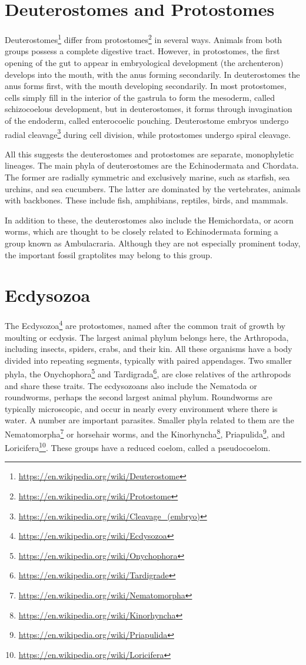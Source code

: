 \documentclass[]{book}
\let\rmarkdownfootnote\footnote%
\def\footnote{\protect\rmarkdownfootnote}
\renewcommand{\href}[2]{#2\footnote{\url{#1}}}
\theoremstyle{definition}
\theoremstyle{definition}
\theoremstyle{definition}
\theoremstyle{remark}
\begin{document}
\section{Deuterostomes and
Protostomes}\label{deuterostomes-and-protostomes}

\href{https://en.wikipedia.org/wiki/Deuterostome}{Deuterostomes} differ
from \href{https://en.wikipedia.org/wiki/Protostome}{protostomes} in
several ways. Animals from both groups possess a complete digestive
tract. However, in protostomes, the first opening of the gut to appear
in embryological development (the archenteron) develops into the mouth,
with the anus forming secondarily. In deuterostomes the anus forms
first, with the mouth developing secondarily. In most protostomes, cells
simply fill in the interior of the gastrula to form the mesoderm, called
schizocoelous development, but in deuterostomes, it forms through
invagination of the endoderm, called enterocoelic pouching. Deuterostome
embryos undergo radial \href{https://en.wikipedia.org/wiki/Cleavage_(embryo)}{cleavage} during cell division, while protostomes
undergo spiral cleavage.

All this suggests the deuterostomes and protostomes are separate,
monophyletic lineages. The main phyla of deuterostomes are the
Echinodermata and Chordata. The former are radially symmetric and
exclusively marine, such as starfish, sea urchins, and sea cucumbers.
The latter are dominated by the vertebrates, animals with backbones.
These include fish, amphibians, reptiles, birds, and mammals.

In addition to these, the deuterostomes also include the Hemichordata,
or acorn worms, which are thought to be closely related to Echinodermata
forming a group known as Ambulacraria. Although they are not especially
prominent today, the important fossil graptolites may belong to this
group.

\section{Ecdysozoa}\label{ecdysozoa}

The \href{https://en.wikipedia.org/wiki/Ecdysozoa}{Ecdysozoa} are
protostomes, named after the common trait of growth by moulting or
ecdysis. The largest animal phylum belongs here, the Arthropoda,
including insects, spiders, crabs, and their kin. All these organisms
have a body divided into repeating segments, typically with paired
appendages. Two smaller phyla, the \href{https://en.wikipedia.org/wiki/Onychophora}{Onychophora} and \href{https://en.wikipedia.org/wiki/Tardigrade}{Tardigrada}, are close
relatives of the arthropods and share these traits. The ecdysozoans also
include the Nematoda or roundworms, perhaps the second largest animal
phylum. Roundworms are typically microscopic, and occur in nearly every
environment where there is water. A number are important parasites.
Smaller phyla related to them are the \href{https://en.wikipedia.org/wiki/Nematomorpha}{Nematomorpha} or horsehair worms,
and the \href{https://en.wikipedia.org/wiki/Kinorhyncha}{Kinorhyncha}, \href{https://en.wikipedia.org/wiki/Priapulida}{Priapulida}, and \href{https://en.wikipedia.org/wiki/Loricifera}{Loricifera}. These groups have a
reduced coelom, called a pseudocoelom.
\end{document}
